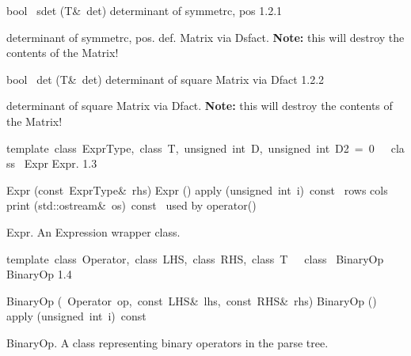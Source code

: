 \documentclass{article}
\begin{document}
\begin{cxxentry}
\begin{cxxclass}
\begin{cxxdoc}
\end{cxxdoc}
\begin{cxxfunction}
{bool\ }
        {sdet}
        {(T\&\ det)}
        {determinant of symmetrc, pos}
        {1.2.1}
\begin{cxxdoc}
determinant of symmetrc, pos. def. Matrix via Dsfact. \textbf{Note:} this
will destroy the contents of the Matrix!
\end{cxxdoc}
\end{cxxfunction}
\begin{cxxfunction}
{bool\ }
        {det}
        {(T\&\ det)}
        {determinant of square Matrix via Dfact}
        {1.2.2}
\begin{cxxdoc}
determinant of square Matrix via Dfact. \textbf{Note:} this will destroy
the contents of the Matrix! 
\end{cxxdoc}
\end{cxxfunction}
\end{cxxclass}
\begin{cxxclass}
{template\ \<class\ ExprType,\ class\ T,\ unsigned\ int\ D,\ unsigned\ int\ D2\ =\ 0\>\ \ \ class\ }
        {Expr}
        {}
        {Expr.
}
        {1.3}
\begin{cxxpublic}
\cxxitem{}
        {Expr}
        {(const\ ExprType\&\ rhs)}
        {}
        {}
\label{cxx.1.3.1}
\cxxitem{}
        {\cxxtilde Expr}
        {()}
        {}
        {}
\label{cxx.1.3.2}
        {apply}
        {(unsigned\ int\ i)\ const\ }
        {}
        {}
\label{cxx.1.3.3}
        {rows}
        {}
        {}
        {}
\label{cxx.1.3.4}
        {cols}
        {}
        {}
        {}
\label{cxx.1.3.5}
        {print}
        {(std::ostream\&\ os)\ const\ }
        { used by operator\<\<()}
        {}
\label{cxx.1.3.6}
\end{cxxpublic}
\begin{cxxdoc}
Expr.
An Expression wrapper class.


\end{cxxdoc}
\end{cxxclass}
\begin{cxxclass}
{template\ \<class\ Operator,\ class\ LHS,\ class\ RHS,\ class\ T\>\ \ \ class\ }
        {BinaryOp}
        {}
        {BinaryOp
}
        {1.4}
\begin{cxxpublic}
\cxxitem{}
        {BinaryOp}
        {(\ Operator\ op,\ const\ LHS\&\ lhs,\ const\ RHS\&\ rhs)}
        {}
        {}
\label{cxx.1.4.1}
\cxxitem{}
        {\cxxtilde BinaryOp}
        {()}
        {}
        {}
\label{cxx.1.4.2}
        {apply}
        {(unsigned\ int\ i)\ const\ }
        {}
        {}
\label{cxx.1.4.3}
\end{cxxpublic}
\begin{cxxdoc}
BinaryOp.
A class representing binary operators in the parse tree.



\end{cxxdoc}
\end{cxxclass}
\end{cxxentry}
\end{document}
